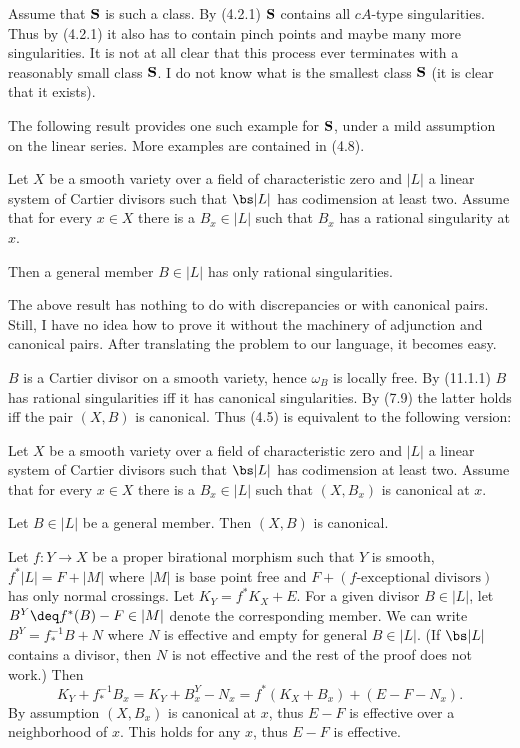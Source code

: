 Assume that $\bold S$ is such a class. By (4.2.1)  $\bold S$ contains all
$cA$-type singularities. Thus by (4.2.1) it also has  to contain pinch
points and maybe many more singularities. It is not at all clear that this
process ever terminates with a reasonably small class $\bold S$.  I
do not know what is the smallest class $\bold S$ (it is clear that it
exists). 

 The
following result provides one such example for $\bold S$, under a mild
assumption on the linear series. More examples  are contained in (4.8). 


  Let $X$ be a smooth variety over a field of
characteristic zero and  $|L|$  
a linear system of Cartier divisors such that $\bs|L|$ has codimension at
least two.  Assume that for every $x\in X$ there is a $B_x\in |L|$ such that
$B_x$ has a rational singularity at $x$. 

Then a   general  member 
$B\in |L|$ has only rational singularities.
\endproclaim

The above result  has nothing to do with discrepancies or with
canonical pairs. Still, I have no idea how to prove it without   the
machinery of adjunction and  canonical pairs. After translating the problem
to our language, it becomes easy.

\demop  $B$ is a Cartier divisor on a smooth variety, hence $\omega_B$ is
locally free. By (11.1.1) $B$ has rational singularities iff it has canonical
singularities.
By (7.9)  the latter holds
iff the pair $(X,B)$ is canonical. Thus (4.5) is equivalent to the following
version:

  Let $X$ be a smooth variety over a field of
characteristic zero and  $|L|$  
a linear system of Cartier divisors such that $\bs|L|$ has codimension at
least two. 
Assume that for every $x\in X$ there is a $B_x\in |L|$ such that $(X,B_x)$
is canonical at $x$. 

Let  $B\in |L|$ be a   general  member. Then $(X,B)$ is canonical.
\endproclaim

\demop 
Let $f:Y\to X$ be a proper birational morphism
such that $Y$ is smooth, $f^*|L|=F+|M|$ where $|M|$ is base point free
 and $F+(f\text{-exceptional divisors})$ has only normal
crossings.   Let $K_Y=f^*K_X+E$.  For a given divisor $B\in |L|$, let 
$B^Y\deq f^*(B)-F\in |M|$ denote the corresponding member. We can write
$B^Y=f^{-1}_*B+N$ where $N$ is effective and empty for general $B\in |L|$. 
(If $\bs|L|$ contains a divisor, then $N$ is not effective and the rest of
the proof does not work.) Then
$$
K_Y+f^{-1}_*B_x=K_Y+B^Y_x-N_x=f^*(K_X+B_x)+(E-F-N_x).
$$
By assumption $(X,B_x)$ is canonical at $x$, thus $E-F$ is effective over a
neighborhood of $x$.  This holds for any $x$, thus $E-F$ is effective.

